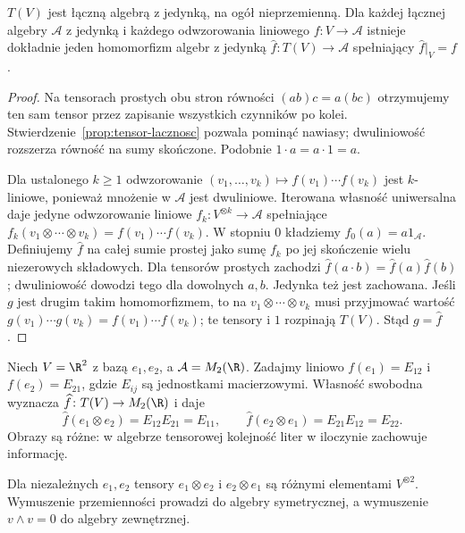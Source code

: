\begin{twierdzenie}
\label{thm:algebra-tensorowa-universal}
$T(V)$ jest łączną algebrą z jedynką, na ogół nieprzemienną.
Dla każdej łącznej algebry $\mathcal A$ z jedynką i każdego
odwzorowania liniowego $f\colon V\to\mathcal A$ istnieje dokładnie jeden
homomorfizm algebr z jedynką $\widehat f\colon T(V)\to\mathcal A$
spełniający $\widehat f|_V=f$.
\end{twierdzenie}
\begin{proof}
Na tensorach prostych obu stron równości
$(ab)c=a(bc)$ otrzymujemy ten sam tensor przez zapisanie
wszystkich czynników po kolei. Stwierdzenie~\ref{prop:tensor-lacznosc}
pozwala pominąć nawiasy; dwuliniowość rozszerza równość
na sumy skończone. Podobnie $1\cdot a=a\cdot1=a$.

Dla ustalonego $k\geq1$ odwzorowanie
$(v_1,\ldots,v_k)\mapsto f(v_1)\cdots f(v_k)$
jest $k$-liniowe, ponieważ mnożenie w $\mathcal A$ jest
dwuliniowe. Iterowana własność uniwersalna daje jedyne odwzorowanie
liniowe $f_k\colon V^{\otimes k}\to\mathcal A$ spełniające
$f_k(v_1\otimes\cdots\otimes v_k)=f(v_1)\cdots f(v_k)$.
W stopniu $0$ kładziemy $f_0(a)=a1_{\mathcal A}$.
Definiujemy $\widehat f$ na całej sumie prostej jako sumę
$f_k$ po jej skończenie wielu niezerowych składowych.
Dla tensorów prostych zachodzi
$\widehat f(a\cdot b)=\widehat f(a)\widehat f(b)$;
dwuliniowość dowodzi tego dla dowolnych $a,b$.
Jedynka też jest zachowana. Jeśli $g$ jest drugim takim
homomorfizmem, to na $v_1\otimes\cdots\otimes v_k$
musi przyjmować wartość $g(v_1)\cdots g(v_k)
=f(v_1)\cdots f(v_k)$; te tensory i $1$ rozpinają $T(V)$.
Stąd $g=\widehat f$.
\end{proof}

\begin{przyklad}
Niech $V=\R^2$ z bazą $e_1,e_2$, a
$\mathcal A=M_2(\R)$. Zadajmy liniowo
$f(e_1)=E_{12}$ i $f(e_2)=E_{21}$, gdzie $E_{ij}$ są
jednostkami macierzowymi. Własność swobodna wyznacza
$\widehat f\colon T(V)\to M_2(\R)$ i daje
\[
 \widehat f(e_1\otimes e_2)=E_{12}E_{21}=E_{11},
 \qquad
 \widehat f(e_2\otimes e_1)=E_{21}E_{12}=E_{22}.
\]
Obrazy są różne: w algebrze tensorowej kolejność liter
w iloczynie zachowuje informację.
\end{przyklad}

Dla niezależnych $e_1,e_2$ tensory $e_1\otimes e_2$ i
$e_2\otimes e_1$ są różnymi elementami $V^{\otimes2}$.
Wymuszenie przemienności prowadzi do algebry symetrycznej,
a wymuszenie $v\wedge v=0$ do algebry zewnętrznej.

